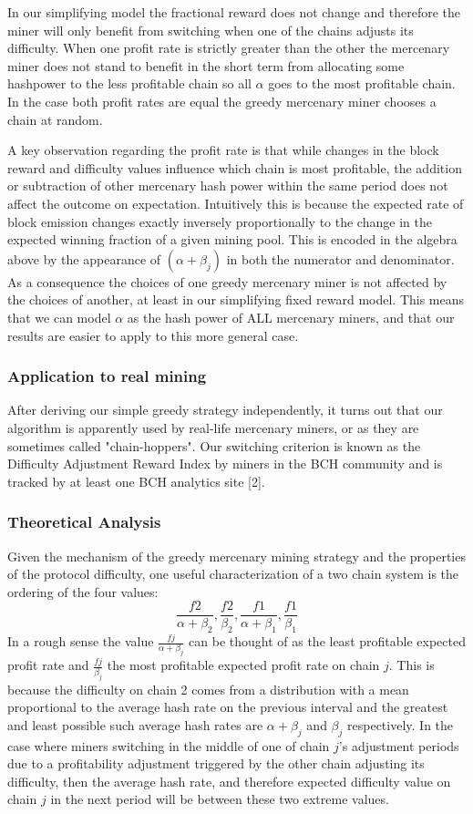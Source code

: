 \documentclass[10pt, preprint]{aastex}
\begin{document}
In our simplifying model the fractional reward does not change and therefore the miner will only benefit from switching when one of the chains adjusts its difficulty.  When one profit rate is strictly greater than the other the mercenary miner does not stand to benefit in the short term from allocating some hashpower to the less profitable chain so all $\alpha$ goes to the most profitable chain.  In the case both profit rates are equal the greedy mercenary miner chooses a chain at random. 

A key observation regarding the profit rate is that while changes in the block reward and difficulty values influence which chain is most profitable, the addition or subtraction of other mercenary hash power within the same period does not affect the outcome on expectation.  Intuitively this is because the expected rate of block emission changes exactly inversely proportionally to the change in the expected winning fraction of a given mining pool.  This is encoded in the algebra above by the appearance of $(\alpha + \beta_j)$ in both the numerator and denominator.  As a consequence the choices of one greedy mercenary miner is not affected by the choices of another, at least in our simplifying fixed reward model.  This means that we can model $\alpha$ as the hash power of ALL mercenary miners, and that our results are easier to apply to this more general case.

\subsubsection{Application to real mining}
After deriving our simple greedy strategy independently, it turns out that our algorithm is apparently used by real-life mercenary miners, or as they are sometimes called "chain-hoppers".  Our switching criterion is known as the Difficulty Adjustment Reward Index by miners in the BCH community and is tracked by at least one BCH analytics site [2].

\subsubsection{Theoretical Analysis}
Given the mechanism of the greedy mercenary mining strategy and the properties of the protocol difficulty, one useful characterization of a two chain system is the ordering of the four values: 
$$
\frac{f2}{\alpha + \beta_2}, \frac{f2}{\beta_2}, \frac{f1}{\alpha + \beta_1}, \frac{f1}{\beta_1}
$$
In a rough sense the value $\frac{fj}{\alpha + \beta_j}$ can be thought of as the least profitable expected profit rate and $\frac{fj}{\beta_j}$ the most profitable expected profit rate on chain $j$.  This is because the difficulty on chain 2 comes from a distribution with a mean proportional to the average hash rate on the previous interval and the greatest and least possible such average hash rates are $\alpha + \beta_j$ and $\beta_j$ respectively.  In the case where miners switching in the middle of one of chain $j$'s adjustment periods due to a profitability adjustment triggered by the other chain adjusting its difficulty, then the average hash rate, and therefore expected difficulty value on chain $j$ in the next period will be between these two extreme values.
\end{document}
